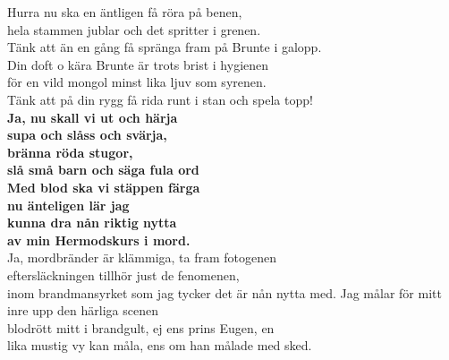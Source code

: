 \documentclass[a6paper, 10pt, twoside]{article}
\begin{document}
\begin{center}
\end{center}
\begin{lyrics}
Hurra nu ska en äntligen \physicalonly{\\}få röra på benen,\\
hela stammen jublar \physicalonly{\\}och det spritter i grenen.\\
Tänk att än en gång få spränga fram \physicalonly{\\}på Brunte i galopp.
\vspace{5pt}\\
Din doft o kära Brunte är \physicalonly{\\}trots brist i hygienen\\
för en vild mongol \physicalonly{\\}minst lika ljuv som syrenen.\\
Tänk att på din rygg få rida runt \physicalonly{\\}i stan och spela topp! 
\vspace{5pt}\\
\textbf{Ja, nu skall vi ut och härja\\
supa och slåss och svärja,\\
bränna röda stugor,\\
slå små barn och säga fula ord\\
Med blod ska vi stäppen färga\\
nu änteligen lär jag\\
kunna dra nån riktig nytta \\
av min Hermodskurs i mord. }
\vspace{5pt}\\
Ja, mordbränder är klämmiga, \physicalonly{\\}ta fram fotogenen\\
eftersläckningen tillhör just de fenomenen,\\
inom brandmansyrket \physicalonly{\\}som jag tycker det är nån nytta med.
\newpage 
\noindent
Jag målar för mitt inre upp \physicalonly{\\}den härliga scenen\\
blodrött mitt i brandgult, \physicalonly{\\}ej ens prins Eugen, en\\
lika mustig vy kan måla, \physicalonly{\\}ens om han målade med sked.

\end{lyrics}
\end{document}
